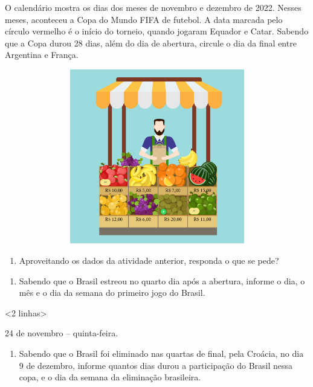 O calendário mostra os dias dos meses de novembro e dezembro de
2022. Nesses meses, aconteceu a Copa do Mundo FIFA de futebol. A data
marcada pelo círculo vermelho é o início do torneio, quando jogaram
Equador e Catar. Sabendo que a Copa durou 28 dias, além do dia de abertura, circule o dia da
final entre Argentina e França.


\includegraphics[width=6.01042in,height=3.00521in]{media/image65.png}


\begin{enumerate}
\def\labelenumi{\arabic{enumi}.}
\item
  Aproveitando os dados da atividade anterior, responda o que se pede?
\end{enumerate}

\begin{enumerate}
\def\labelenumi{\alph{enumi})}
\item
  Sabendo que o Brasil estreou no quarto dia após a abertura, informe o dia, o
  mês e o dia da semana do primeiro jogo do Brasil.
\end{enumerate}

\textless{}2 linhas\textgreater{}

24 de novembro -- quinta-feira.

\begin{enumerate}
\def\labelenumi{\alph{enumi})}
\item
  Sabendo que o Brasil foi eliminado nas quartas de final, pela Croácia,
  no dia 9 de dezembro, informe quantos dias durou a participação do
  Brasil nessa copa, e o dia da semana da eliminação brasileira.
\end{enumerate}

